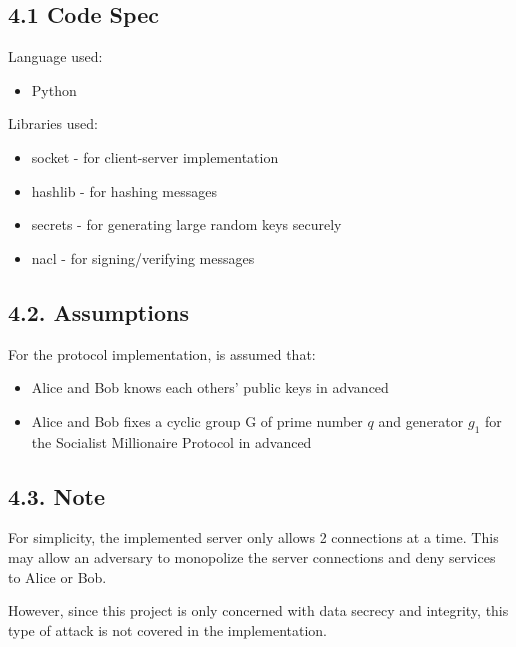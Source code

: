 \documentclass{article}
\begin{document}
\subsection*{4.1 Code Spec}

Language used: 
\begin{itemize}
  \item Python
\end{itemize}

Libraries used: 
\begin{itemize}
  \item socket - for client-server implementation
  \item hashlib - for hashing messages
  \item secrets - for generating large random keys securely
  \item nacl - for signing/verifying messages
\end{itemize}

\subsection*{4.2. Assumptions}

For the protocol implementation, is assumed that:

\begin{itemize}
  \item Alice and Bob knows each others' public keys in advanced
  \item Alice and Bob fixes a cyclic group G of prime number $q$ and generator $g_1$ 
  for the Socialist Millionaire Protocol in advanced
\end{itemize}

\subsection*{4.3. Note}

For simplicity, the implemented server only allows 2 connections at a time. 
This may allow an adversary to monopolize the server connections and deny 
services to Alice or Bob. 

However, since this project is only concerned with 
data secrecy and integrity, this type of attack is not covered in the 
implementation.
\end{document}
